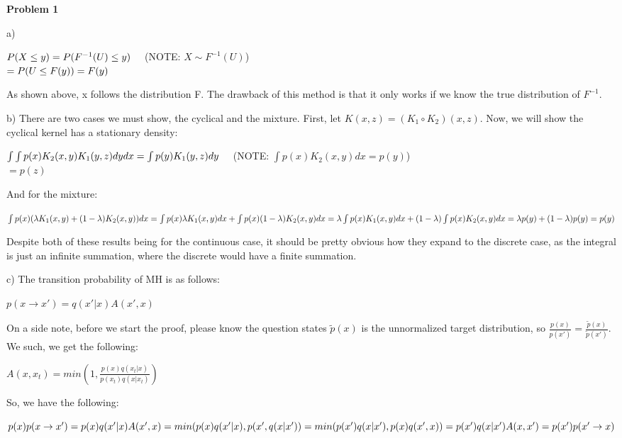 \textbf{Problem 1}

a)

$P(X \leq y)\\
= P(F^{-1}(U) \leq y)\quad$ (NOTE: $X \sim F^{-1}(U)$)\\
$= P(U \leq F(y))\\
= F(y)$

As shown above, x follows the distribution F. The drawback of this method is that it only works if we know the true distribution of $F^{-1}$. 

b) There are two cases we must show, the cyclical and the mixture. First, let $K(x, z) = (K_1 \circ K_2)(x, z)$. Now, we will show the cyclical kernel has a stationary density:

$\int\int p(x)K_2(x, y)K_1(y, z) dy dx\\
= \int p(y)K_1(y, z) dy\quad$ (NOTE: $\int p(x)K_2(x, y) dx = p(y)$)\\
$= p(z)$

And for the mixture:

$\int p(x)(\lambda K_1(x, y) + (1-\lambda)K_2(x, y)) dx\\
= \int p(x)\lambda K_1(x, y)dx + \int p(x)(1-\lambda)K_2(x, y)dx\\
= \lambda\int p(x)K_1(x, y)dx + (1-\lambda)\int p(x)K_2(x, y)dx\\
= \lambda p(y) + (1-\lambda)p(y)\\
= p(y)$

Despite both of these results being for the continuous case, it should be pretty obvious how they expand to the discrete case, as the integral is just an infinite summation, where the discrete would have a finite summation.

c) The transition probability of MH is as follows:

$p(x \rightarrow x') = q(x' \vert x)A(x', x)$

On a side note, before we start the proof, please know the question states $\tilde{p}(x)$ is the unnormalized target distribution, so $\frac{p(x)}{p(x')} = \frac{\tilde{p}(x)}{\tilde{p}(x')}$. We such, we get the following:

$A(x, x_t) = min(1, \frac{p(x)q(x_t \vert x)}{p(x_t)q(x \vert x_t)})$

So, we have the following:

$p(x)p(x \rightarrow x')\\
= p(x)q(x' \vert x)A(x', x)\\
= min(p(x)q(x' \vert x), p(x', q(x\vert x'))\\
= min(p(x')q(x\vert x'), p(x)q(x', x))\\
= p(x')q(x\vert x')A(x, x')\\
= p(x')p(x' \rightarrow x)$

